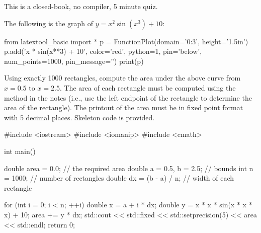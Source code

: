 

This is a closed-book, no compiler, 5 minute quiz.

\nextq
The following is the graph of $y = x^2 \sin(x^3) + 10$:
\begin{python}
from latextool_basic import *
p = FunctionPlot(domain='0:3', height='1.5in')
p.add('x * sin(x**3) + 10', color='red', python=1, pin='below', num_points=1000,
pin_message='')
print(p)
\end{python}
Using exactly 1000 rectangles, compute the area under the above curve
from $x = 0.5$ to $x = 2.5$.
The area of each rectangle must be computed using the method in the notes
(i.e., use the left endpoint of the rectangle to determine the area of the rectangle).
The printout of the area must be in fixed point format with 5 decimal
places.
Skeleton code is provided.
\\
\ANSWER
\begin{answercode}
#include <iostream>
#include <iomanip>
#include <cmath>

int main()
{
    double area = 0.0;                // the required area
    double a = 0.5, b = 2.5;          // bounds
    int n = 1000;                     // number of rectangles
    double dx = (b - a) / n;          // width of each rectangle

    for (int i = 0; i < n; ++i)       
    {
        double x = a + i * dx;        
        double y = x * x * sin(x * x * x) + 10; 
        area += y * dx;
    }
    std::cout << std::fixed << std::setprecision(5) << area << std::endl;
    return 0;
}
\end{answercode}

